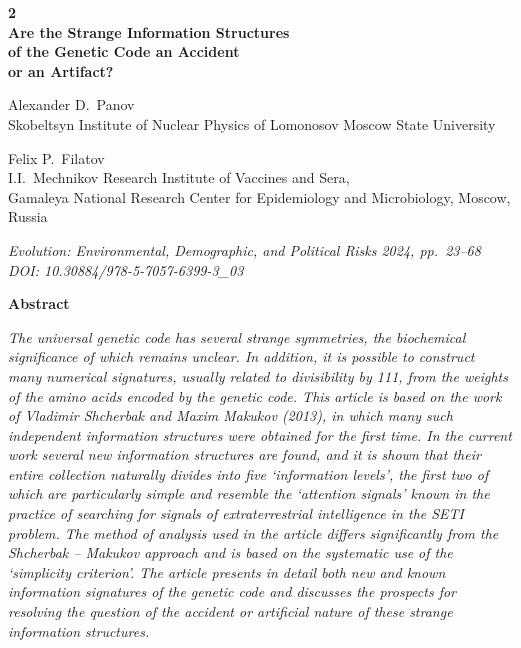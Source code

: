 \documentclass[12pt]{article}
\begin{document}
\begin{center}
{\Large\bfseries 2}\\[0.5em]
{\Large\bfseries Are the Strange Information Structures\\
of the Genetic Code an Accident\\
or an Artifact?}

\vspace{1em}

{\large Alexander D.\ Panov}\\[0.3em]
{\small Skobeltsyn Institute of Nuclear Physics of Lomonosov Moscow State University}

\vspace{0.5em}

{\large Felix P.\ Filatov}\\[0.3em]
{\small I.I.\ Mechnikov Research Institute of Vaccines and Sera,\\
Gamaleya National Research Center for Epidemiology and Microbiology, Moscow, Russia}

\vspace{0.5em}

{\small\itshape Evolution: Environmental, Demographic, and Political Risks 2024, pp.\ 23--68\\
DOI: 10.30884/978-5-7057-6399-3\_03}
\end{center}

\vspace{2em}

\noindent\textbf{Abstract}

\noindent\textit{The universal genetic code has several strange symmetries, the biochemical significance of which remains unclear. In addition, it is possible to construct many numerical signatures, usually related to divisibility by 111, from the weights of the amino acids encoded by the genetic code. This article is based on the work of Vladimir Shcherbak and Maxim Makukov (2013), in which many such independent information structures were obtained for the first time. In the current work several new information structures are found, and it is shown that their entire collection naturally divides into five `information levels', the first two of which are particularly simple and resemble the `attention signals' known in the practice of searching for signals of extraterrestrial intelligence in the SETI problem. The method of analysis used in the article differs significantly from the Shcherbak -- Makukov approach and is based on the systematic use of the `simplicity criterion'. The article presents in detail both new and known information signatures of the genetic code and discusses the prospects for resolving the question of the accident or artificial nature of these strange information structures.}
\end{document}
